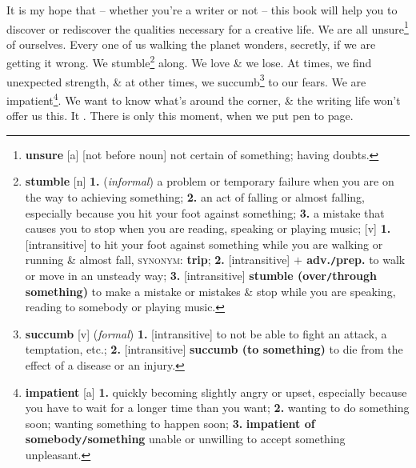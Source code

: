 \documentclass[oneside]{book}
\numberwithin{equation}{section}
\begin{document}
It is my hope that -- whether you're a writer or not -- this book will help you to discover or rediscover the qualities necessary for a creative life. We are all unsure\footnote{\textbf{unsure} [a] [not before noun] not certain of something; having doubts.} of ourselves. Every one of us walking the planet wonders, secretly, if we are getting it wrong. We stumble\footnote{\textbf{stumble} [n] \textbf{1.} (\textit{informal}) a problem or temporary failure when you are on the way to achieving something; \textbf{2.} an act of falling or almost falling, especially because you hit your foot against something; \textbf{3.} a mistake that causes you to stop when you are reading, speaking or playing music; [v] \textbf{1.} [intransitive] to hit your foot against something while you are walking or running \& almost fall, \textsc{synonym}: \textbf{trip}; \textbf{2.} [intransitive] \textbf{$+$ adv.\texttt{/}prep.} to walk or move in an unsteady way; \textbf{3.} [intransitive] \textbf{stumble (over\texttt{/}through something)} to make a mistake or mistakes \& stop while you are speaking, reading to somebody or playing music.} along. We love \& we lose. At times, we find unexpected strength, \& at other times, we succumb\footnote{\textbf{succumb} [v] (\textit{formal}) \textbf{1.} [intransitive] to not be able to fight an attack, a temptation, etc.; \textbf{2.} [intransitive] \textbf{succumb (to something)} to die from the effect of a disease or an injury.} to our fears. We are impatient\footnote{\textbf{impatient} [a] \textbf{1.} quickly becoming slightly angry or upset, especially because you have to wait for a longer time than you want; \textbf{2.} wanting to do something soon; wanting something to happen soon; \textbf{3.} \textbf{impatient of somebody\texttt{/}something} unable or unwilling to accept something unpleasant.}. We want to know what's around the corner, \& the writing life won't offer us this. It . There is only this moment, when we put pen to page.
\end{document}
